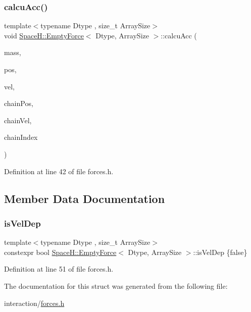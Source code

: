 \subsubsection{\texorpdfstring{calcu\+Acc()}{calcuAcc()}\hspace{0.1cm}{\footnotesize\ttfamily [4/4]}}
{\footnotesize\ttfamily template$<$typename Dtype , size\+\_\+t Array\+Size$>$ \\
void \mbox{\hyperlink{struct_space_h_1_1_empty_force}{Space\+H\+::\+Empty\+Force}}$<$ Dtype, Array\+Size $>$\+::calcu\+Acc (\begin{DoxyParamCaption}\item[{const \mbox{\hyperlink{struct_space_h_1_1_empty_force_afdeb66410650cdb1e2e3b1e1fd79540c}{Scalar\+Array}} \&}]{mass,  }\item[{const \mbox{\hyperlink{struct_space_h_1_1_empty_force_a06ad868879a6fa5def9c7f9fd75fffde}{Vector\+Array}} \&}]{pos,  }\item[{const \mbox{\hyperlink{struct_space_h_1_1_empty_force_a06ad868879a6fa5def9c7f9fd75fffde}{Vector\+Array}} \&}]{vel,  }\item[{const \mbox{\hyperlink{struct_space_h_1_1_empty_force_a06ad868879a6fa5def9c7f9fd75fffde}{Vector\+Array}} \&}]{chain\+Pos,  }\item[{const \mbox{\hyperlink{struct_space_h_1_1_empty_force_a06ad868879a6fa5def9c7f9fd75fffde}{Vector\+Array}} \&}]{chain\+Vel,  }\item[{const \mbox{\hyperlink{struct_space_h_1_1_empty_force_a25e0bd933dd3715e315c1abdb6843c36}{Index\+Array}} \&}]{chain\+Index }\end{DoxyParamCaption})\hspace{0.3cm}{\ttfamily [inline]}}



Definition at line 42 of file forces.\+h.



\subsection{Member Data Documentation}
\mbox{\label{struct_space_h_1_1_empty_force_a9c02c91b7ec657b88c89ef02307ca4b5}} 
\subsubsection{\texorpdfstring{is\+Vel\+Dep}{isVelDep}}
{\footnotesize\ttfamily template$<$typename Dtype , size\+\_\+t Array\+Size$>$ \\
constexpr bool \mbox{\hyperlink{struct_space_h_1_1_empty_force}{Space\+H\+::\+Empty\+Force}}$<$ Dtype, Array\+Size $>$\+::is\+Vel\+Dep \{false\}\hspace{0.3cm}{\ttfamily [static]}}



Definition at line 51 of file forces.\+h.



The documentation for this struct was generated from the following file\+:\begin{DoxyCompactItemize}
\item 
interaction/\mbox{\hyperlink{forces_8h}{forces.\+h}}\end{DoxyCompactItemize}
